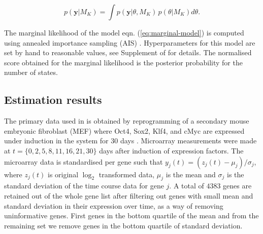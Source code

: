 \begin{equation}
  \label{eq:marginal-model}
  p(\mathbf{y} | M_K) = \int p(\mathbf{y} | \theta, M_K)\, p(\theta | M_K) d\theta.
\end{equation}

The marginal likelihood of the model eqn. (\ref{eq:marginal-model}) is computed using annealed importance sampling (AIS) \citep{Neal:2001ed}. Hyperparameters for this model are set by hand to reasonable values, see Supplement of \cite{Armond:2013} for details. The normalised score obtained for the marginal likelihood is the posterior probability for the number of states.

\subsection{Estimation results}
\label{sec:estimation-results}

The primary data used in \cite{Armond:2013} is obtained by reprogramming of a secondary mouse embryonic fibroblast (MEF) where Oct4, Sox2, Klf4, and cMyc are expressed under induction in the system for 30 days \citep{SamavarchiTehrani:2010cp}. Microarray measurements were made at $t = \lbrace 0, 2, 5, 8, 11, 16, 21, 30 \rbrace$ days after induction of expression factors. The microarray data is standardised per gene such that $y_j(t) = \left(z_j(t) - \mu_j \right) / \sigma_j$, where $z_j(t)$ is original $\log_2$ transformed data, $\mu_j$ is the mean and $\sigma_j$ is the standard deviation of the time course data for gene $j$. A total of $4383$ genes are retained out of the whole gene list after filtering out genes with small mean and standard deviation in their expression over time, as a way of removing uninformative genes. First genes in the bottom quartile of the mean and from the remaining set we remove genes in the bottom quartile of standard deviation.

